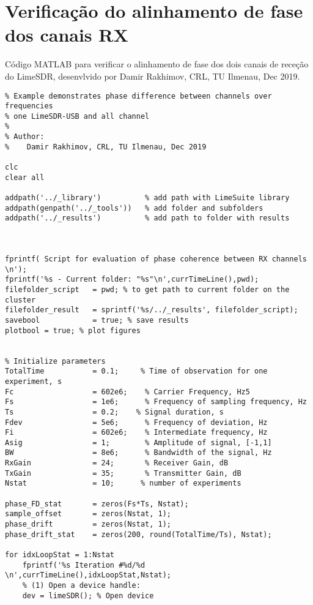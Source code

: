 
\chapter{Verificação do alinhamento de fase dos canais RX} %

\label{Annex2} %

Código MATLAB para verificar o alinhamento de fase dos dois canais de receção do LimeSDR, desenvlvido por Damir Rakhimov, CRL, TU Ilmenau, Dec 2019.

\begin{verbatim}
% Example demonstrates phase difference between channels over frequencies
% one LimeSDR-USB and all channel
%
% Author:
%    Damir Rakhimov, CRL, TU Ilmenau, Dec 2019

clc
clear all

addpath('../_library')          % add path with LimeSuite library
addpath(genpath('../_tools'))   % add folder and subfolders 
addpath('../_results')          % add path to folder with results



fprintf( Script for evaluation of phase coherence between RX channels \n');
fprintf('%s - Current folder: "%s"\n',currTimeLine(),pwd);
filefolder_script  	= pwd; % to get path to current folder on the cluster
filefolder_result  	= sprintf('%s/../_results', filefolder_script);
savebool           	= true; % save results
plotbool = true; % plot figures


% Initialize parameters
TotalTime           = 0.1;     % Time of observation for one experiment, s
Fc                  = 602e6;    % Carrier Frequency, Hz5
Fs                  = 1e6;      % Frequency of sampling frequency, Hz
Ts                  = 0.2;    % Signal duration, s
Fdev                = 5e6;      % Frequency of deviation, Hz
Fi                  = 602e6;    % Intermediate frequency, Hz
Asig                = 1;        % Amplitude of signal, [-1,1]
BW                  = 8e6;      % Bandwidth of the signal, Hz 
RxGain              = 24;       % Receiver Gain, dB
TxGain              = 35;       % Transmitter Gain, dB
Nstat               = 10;      % number of experiments

phase_FD_stat       = zeros(Fs*Ts, Nstat);
sample_offset       = zeros(Nstat, 1);
phase_drift         = zeros(Nstat, 1);
phase_drift_stat    = zeros(200, round(TotalTime/Ts), Nstat);

for idxLoopStat = 1:Nstat
    fprintf('%s Iteration #%d/%d \n',currTimeLine(),idxLoopStat,Nstat);
    % (1) Open a device handle:
    dev = limeSDR(); % Open device
    

\end{verbatim}
